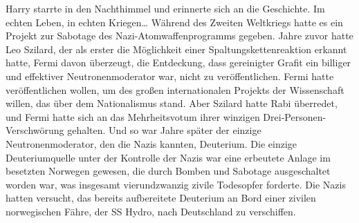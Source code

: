 Harry starrte in den Nachthimmel und erinnerte sich an die Geschichte.
Im echten Leben, in echten Kriegen…
Während des Zweiten Weltkriegs hatte es ein Projekt zur Sabotage des Nazi-Atomwaffenprogramms gegeben. Jahre zuvor hatte Leo Szilard, der als erster die Möglichkeit einer Spaltungskettenreaktion erkannt hatte, Fermi davon überzeugt, die Entdeckung, dass gereinigter Grafit ein billiger und effektiver Neutronenmoderator war, nicht zu veröffentlichen. Fermi hatte veröffentlichen wollen, um des großen internationalen Projekts der Wissenschaft willen, das über dem Nationalismus stand. Aber Szilard hatte Rabi überredet, und Fermi hatte sich an das Mehrheitsvotum ihrer winzigen Drei-Personen-Verschwörung gehalten. Und so war Jahre später der einzige Neutronenmoderator, den die Nazis kannten, Deuterium.
Die einzige Deuteriumquelle unter der Kontrolle der Nazis war eine erbeutete Anlage im besetzten Norwegen gewesen, die durch Bomben und Sabotage ausgeschaltet worden war, was insgesamt vierundzwanzig zivile Todesopfer forderte.
Die Nazis hatten versucht, das bereits aufbereitete Deuterium an Bord einer zivilen norwegischen Fähre, der SS Hydro, nach Deutschland zu verschiffen.
